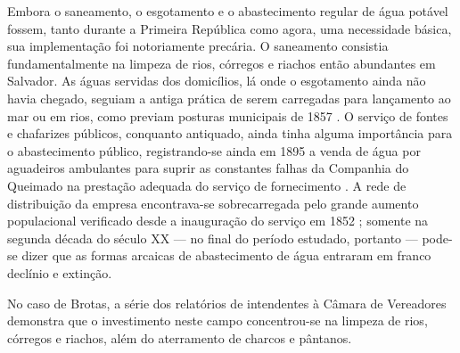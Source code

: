 Embora o saneamento, o esgotamento e o abastecimento regular de água potável fossem, tanto durante a Primeira República como agora, uma necessidade básica, sua implementação foi notoriamente precária.  O saneamento consistia fundamentalmente na limpeza de rios, córregos e riachos então abundantes em Salvador. As águas servidas dos domicílios, lá onde o esgotamento ainda não havia chegado, seguiam a antiga prática de serem carregadas para lançamento ao mar ou em rios, como previam posturas municipais de 1857 \cite[p.~118]{SAMPAIO2005}. O serviço de fontes e chafarizes públicos, conquanto antiquado, ainda tinha alguma importância para o abastecimento público, registrando-se ainda em 1895 a venda de água por aguadeiros ambulantes para suprir as constantes falhas da Companhia do Queimado na prestação adequada do serviço de fornecimento \cite[p.~129]{SAMPAIO2005}. A rede de distribuição da empresa encontrava-se sobrecarregada pelo grande aumento populacional verificado desde a inauguração do serviço em 1852 \cite[p.~273]{santos_theodoro_2010}; somente na segunda década do século XX --- no final do período estudado, portanto --- pode-se dizer que as formas arcaicas de abastecimento de água entraram em franco declínio e extinção. 

No caso de Brotas, a série dos relatórios de intendentes à Câmara de Vereadores demonstra que o investimento neste campo concentrou-se na limpeza de rios, córregos e riachos, além do aterramento de charcos e pântanos.

